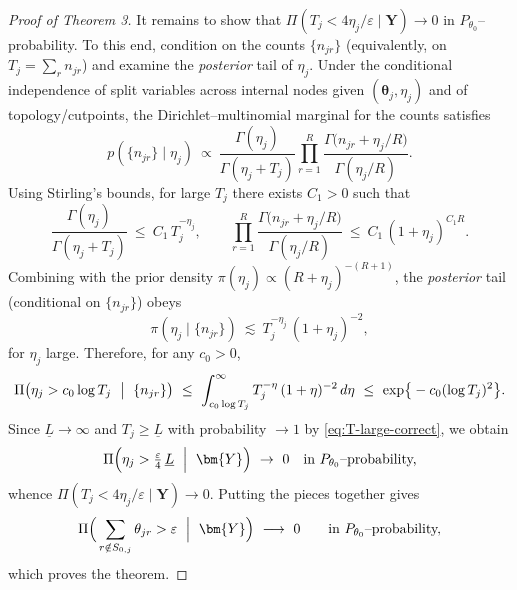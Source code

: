 \documentclass[11pt]{article}
\theoremstyle{plain}
\theoremstyle{definition}
\theoremstyle{plain}
\begin{document}
\begin{proof}[Proof of Theorem 3]
It remains to show that $\Pi(T_j<4\eta_j/\varepsilon\mid \bm{Y})\to 0$ in $P_{\theta_0}$–probability.
To this end, condition on the counts $\{n_{jr}\}$ (equivalently, on $T_j=\sum_r n_{jr}$) and examine the \emph{posterior} tail of $\eta_j$.
Under the conditional independence of split variables across internal nodes given $(\boldsymbol\theta_j,\eta_j)$ and of topology/cutpoints, the Dirichlet–multinomial marginal for the counts satisfies
\[
p(\{n_{jr}\}\mid \eta_j)\ \propto\
\frac{\Gamma(\eta_j)}{\Gamma(\eta_j+T_j)}
\prod_{r=1}^R \frac{\Gamma\!\big(n_{jr}+\eta_j/R\big)}{\Gamma(\eta_j/R)}.
\]
Using Stirling’s bounds, for large $T_j$ there exists $C_1>0$ such that
\[
\frac{\Gamma(\eta_j)}{\Gamma(\eta_j+T_j)}\ \le\ C_1\,T_j^{-\eta_j},\qquad
\prod_{r=1}^R \frac{\Gamma\!\big(n_{jr}+\eta_j/R\big)}{\Gamma(\eta_j/R)}\ \le\ C_1\,(1+\eta_j)^{C_1 R}.
\]
Combining with the prior density $\pi(\eta_j)\propto (R+\eta_j)^{-(R+1)}$, the \emph{posterior} tail (conditional on $\{n_{jr}\}$) obeys
\[
\pi(\eta_j\mid \{n_{jr}\})
\ \lesssim\ T_j^{-\eta_j}\,(1+\eta_j)^{-2},
\]
for $\eta_j$ large. Therefore, for any $c_0>0$,
\[
\Pi\big(\eta_j>c_0\log T_j\ \bigm|\ \{n_{jr}\}\big)
\ \le\ \int_{c_0\log T_j}^{\infty} T_j^{-\eta}\,(1+\eta)^{-2}\,d\eta
\ \le\ \exp\!\big\{-c_0(\log T_j)^2\big\}.
\]
Since $\underline L\to\infty$ and $T_j\ge \underline L$ with probability $\to 1$ by \eqref{eq:T-large-correct}, we obtain
\[
\Pi\Big(\eta_j>\tfrac{\varepsilon}{4}\,\underline L\ \Bigm|\ \bm{Y}\Big)\ \to\ 0
\quad\text{in $P_{\theta_0}$–probability,}
\]
whence
\(
\Pi(T_j<4\eta_j/\varepsilon\mid \bm{Y})\to 0
\).
Putting the pieces together gives
\[
\Pi\Big(\sum_{r\notin S_{0,j}} \theta_{jr} > \varepsilon\ \Bigm|\ \bm{Y}\Big)
\ \longrightarrow\ 0
\qquad\text{in $P_{\theta_0}$–probability,}
\]
which proves the theorem.
\end{proof}

\end{document}
